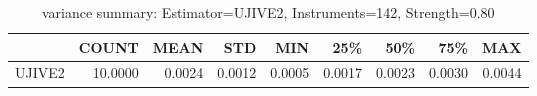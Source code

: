 \begin{table}[ht]
\centering
\caption{variance summary: Estimator=UJIVE2, Instruments=142, Strength=0.80}
\begin{tabular}{lrrrrrrrr}
\toprule
 & COUNT & MEAN & STD & MIN & 25\% & 50\% & 75\% & MAX \\
\midrule
UJIVE2 & 10.0000 & 0.0024 & 0.0012 & 0.0005 & 0.0017 & 0.0023 & 0.0030 & 0.0044 \\
\bottomrule
\end{tabular}
\end{table}
